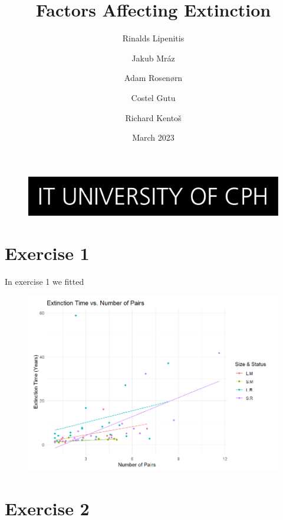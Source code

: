 \documentclass{article}
\begin{document}
\title{Factors Affecting Extinction}
\begin{figure}
    \includegraphics[width=\linewidth]{ITU.jpg}
\end{figure}
\maketitle
\author{Rinalds Lipenitis \and Jakub Mráz \and
Adam Rosenørn \and Costel Gutu \and Richard Kentoš}
\date{March 2023}

\newpage

\section{Exercise 1}
In exercise 1 we fitted 

\begin{figure}
    \includegraphics[width=\linewidth]{graphs/graph1.png}
\end{figure}

\section{Exercise 2}
\end{document}
